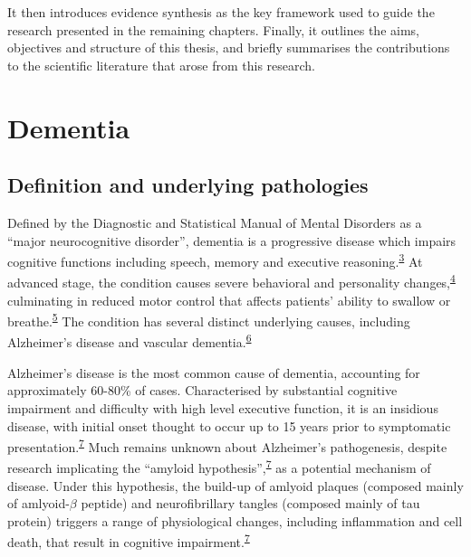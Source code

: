 \documentclass[a4paper, twoside]{templates/ociamthesis}
\begin{document}
It then introduces evidence synthesis as the key framework used to guide the research presented in the remaining chapters. Finally, it outlines the aims, objectives and structure of this thesis, and briefly summarises the contributions to the scientific literature that arose from this research.

\hypertarget{dementia}{%
\section{Dementia}\label{dementia}}

\hypertarget{underlying-pathologies}{%
\subsection{Definition and underlying pathologies}\label{underlying-pathologies}}

Defined by the Diagnostic and Statistical Manual of Mental Disorders as a ``major neurocognitive disorder'', dementia is a progressive disease which impairs cognitive functions including speech, memory and executive reasoning.\textsuperscript{\protect\hyperlink{ref-edition2013}{3}} At advanced stage, the condition causes severe behavioral and personality changes,\textsuperscript{\protect\hyperlink{ref-cerejeira2012}{4}} culminating in reduced motor control that affects patients' ability to swallow or breathe.\textsuperscript{\protect\hyperlink{ref-kumar2013}{5}} The condition has several distinct underlying causes, including Alzheimer's disease and vascular dementia.\textsuperscript{\protect\hyperlink{ref-burns2009}{6}}

Alzheimer's disease is the most common cause of dementia, accounting for approximately 60-80\% of cases. Characterised by substantial cognitive impairment and difficulty with high level executive function, it is an insidious disease, with initial onset thought to occur up to 15 years prior to symptomatic presentation.\textsuperscript{\protect\hyperlink{ref-robinson2015}{7}} Much remains unknown about Alzheimer's pathogenesis, despite research implicating the ``amyloid hypothesis'',\textsuperscript{\protect\hyperlink{ref-robinson2015}{7}} as a potential mechanism of disease. Under this hypothesis, the build-up of amlyoid plaques (composed mainly of amlyoid-\(\beta\) peptide) and neurofibrillary tangles (composed mainly of tau protein) triggers a range of physiological changes, including inflammation and cell death, that result in cognitive impairment.\textsuperscript{\protect\hyperlink{ref-robinson2015}{7}}
\end{document}
